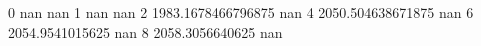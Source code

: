 0 nan nan
1 nan nan
2 1983.1678466796875 nan
4 2050.504638671875 nan
6 2054.9541015625 nan
8 2058.3056640625 nan
